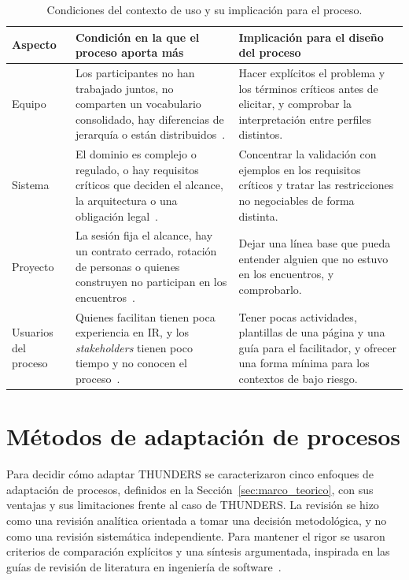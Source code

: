 \documentclass[12pt,letterpaper,oneside]{report}
\begin{document}
\begin{table}[H]
\caption{Condiciones del contexto de uso y su implicación para el proceso.}
\label{tab:contexto_uso}
\centering
\footnotesize
\renewcommand{\arraystretch}{1.15}
\begin{tabularx}{\textwidth}{@{}L{1.7cm}YY@{}}
\toprule
\textbf{Aspecto} & \textbf{Condición en la que el proceso aporta más} &
\textbf{Implicación para el diseño del proceso} \\
\midrule
Equipo & Los participantes no han trabajado juntos, no comparten un vocabulario
consolidado, hay diferencias de jerarquía o están
distribuidos~\cite{alsanoosy2019power,grande2024devops}. & Hacer explícitos el
problema y los términos críticos antes de elicitar, y comprobar la
interpretación entre perfiles distintos. \\
\addlinespace
Sistema & El dominio es complejo o regulado, o hay requisitos críticos que
deciden el alcance, la arquitectura o una obligación
legal~\cite{behutiye2022quality,kosenkov2026}. & Concentrar la validación con
ejemplos en los requisitos críticos y tratar las restricciones no negociables
de forma distinta. \\
\addlinespace
Proyecto & La sesión fija el alcance, hay un contrato cerrado, rotación de
personas o quienes construyen no participan en los
encuentros~\cite{xiao2018,fricker2015}. & Dejar una línea base que pueda
entender alguien que no estuvo en los encuentros, y comprobarlo. \\
\addlinespace
Usuarios del proceso & Quienes facilitan tienen poca experiencia en IR, y los
\textit{stakeholders} tienen poco tiempo y no conocen el
proceso~\cite{agredo2022exploratory,agredo2023strategy}. & Tener pocas actividades, plantillas de una página y una guía para el
facilitador, y ofrecer una forma mínima para los contextos de bajo riesgo. \\
\bottomrule
\end{tabularx}
\end{table}

\section{Métodos de adaptación de procesos}
\label{sec:metodos_adaptacion}
Para decidir cómo adaptar THUNDERS se caracterizaron cinco enfoques de
adaptación de procesos, definidos en la Sección~\ref{sec:marco_teorico}, con
sus ventajas y sus limitaciones frente al caso de THUNDERS. La revisión se hizo
como una revisión analítica orientada a tomar una decisión metodológica, y no
como una revisión sistemática independiente. Para mantener el rigor se usaron
criterios de comparación explícitos y una síntesis argumentada, inspirada en las
guías de revisión de literatura en ingeniería de
software~\cite{kitchenham2007}.
\end{document}
